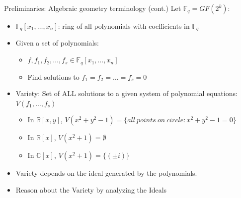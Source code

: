 \documentclass[xcolor=dvipsnames]{beamer}
\begin{document}
\begin{frame}{\large{Preliminaries: Algebraic geometry terminology (cont.)}}
Let $\mathbb{F}_q = GF(2^k)$:
\begin{itemize}
\item $\mathbb{F}_q[x_1, \ldots, x_n]$: ring of all polynomials with
  coefficients in $\mathbb{F}_q$ 
\item Given a set of polynomials:
\begin{itemize}
\item $f, f_1, f_2, \dots , f_s \in \mathbb{F}_q[x_1, \dots, x_n]$
\item Find solutions to $f_1 = f_2 = \dots = f_s = 0$
\end{itemize}
\item \alert{Variety:} Set of ALL solutions to a given system of polynomial equations: $V(f_1, \dots, f_s)$
	\begin{itemize}
	\item In $\mathbb{R}\left[x,y\right]$, $V(x^2+y^2-1)=\{all\  points\  on\ circle: x^2+y^2-1=0\}$
	\item In $\mathbb{R}[x]$, $V(x^2+1)=\emptyset$
	\item In $\mathbb{C}[x]$, $V(x^2+1)=\{(\pm i)\}$
	\end{itemize}
\item Variety depends on the \alert{ideal} generated by the polynomials.
\item Reason about the Variety by analyzing the Ideals
\end{itemize}
\end{frame}
\end{document}
